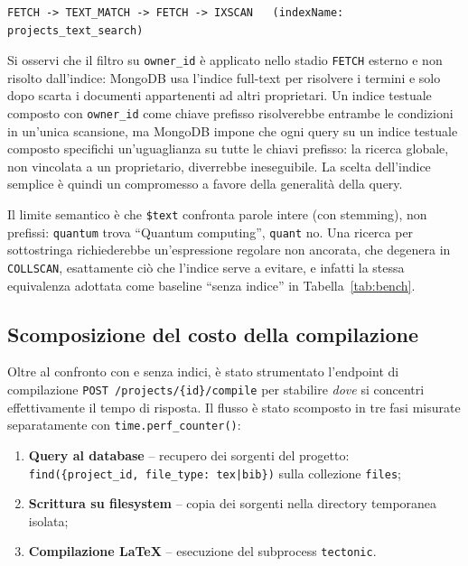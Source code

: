 \documentclass[11pt,a4paper]{article}
\begin{document}
\begin{lstlisting}
FETCH -> TEXT_MATCH -> FETCH -> IXSCAN   (indexName: projects_text_search)
\end{lstlisting}

Si osservi che il filtro su \texttt{owner\_id} è applicato nello stadio \texttt{FETCH} esterno e non risolto dall'indice: MongoDB usa l'indice full-text per risolvere i termini e solo dopo scarta i documenti appartenenti ad altri proprietari. Un indice testuale composto con \texttt{owner\_id} come chiave prefisso risolverebbe entrambe le condizioni in un'unica scansione, ma MongoDB impone che ogni query su un indice testuale composto specifichi un'uguaglianza su tutte le chiavi prefisso: la ricerca globale, non vincolata a un proprietario, diverrebbe ineseguibile. La scelta dell'indice semplice è quindi un compromesso a favore della generalità della query.

Il limite semantico è che \texttt{\$text} confronta parole intere (con stemming), non prefissi: \texttt{quantum} trova ``Quantum computing'', \texttt{quant} no. Una ricerca per sottostringa richiederebbe un'espressione regolare non ancorata, che degenera in \texttt{COLLSCAN}, esattamente ciò che l'indice serve a evitare, e infatti la stessa equivalenza adottata come baseline ``senza indice'' in Tabella~\ref{tab:bench}.

\subsection{Scomposizione del costo della compilazione}
\label{sec:compile-bench}

Oltre al confronto con e senza indici, è stato strumentato l'endpoint di compilazione \texttt{POST /projects/\{id\}/compile} per stabilire \emph{dove} si concentri effettivamente il tempo di risposta. Il flusso è stato scomposto in tre fasi misurate separatamente con \texttt{time.perf\_counter()}:

\begin{enumerate}[leftmargin=2.2em]
  \item \textbf{Query al database} -- recupero dei sorgenti del progetto: \texttt{find(\{project\_id, file\_type: tex|bib\})} sulla collezione \texttt{files};
  \item \textbf{Scrittura su filesystem} -- copia dei sorgenti nella directory temporanea isolata;
  \item \textbf{Compilazione LaTeX} -- esecuzione del subprocess \texttt{tectonic}.
\end{enumerate}
\end{document}
